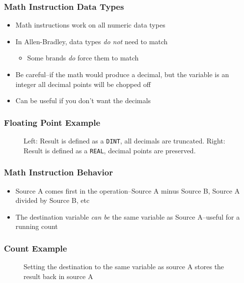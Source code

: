 \begin{frame}
    \frametitle{Math Instruction Data Types}

    \begin{itemize}
        \item Math instructions work on all numeric data types
        \item In Allen-Bradley, data types \emph{do not} need to match
        \begin{itemize}
            \item Some brands \emph{do} force them to match
        \end{itemize}
        \item Be careful--if the math would produce a decimal, but the variable is an integer all decimal points will be chopped off
        \item Can be useful if you don't want the decimals
    \end{itemize}
\end{frame}

\begin{frame}
    \frametitle{Floating Point Example}

    \begin{figure}
        \centering
        

        \vspace{0.5em}
        {\footnotesize Left: Result is defined as a \texttt{DINT}, all decimals are truncated. Right: Result is defined as a \texttt{REAL}, decimal points are preserved.\par}
    \end{figure}
\end{frame}

\begin{frame}
    \frametitle{Math Instruction Behavior}

    \begin{itemize}
        \item Source A comes first in the operation--Source A minus Source B, Source A divided by Source B, etc
        \item The destination variable \emph{can be} the same variable as Source A--useful for a running count
    \end{itemize}
\end{frame}

\begin{frame}
    \frametitle{Count Example}

    \begin{figure}
        \centering
        

        \vspace{0.5em}
        {\footnotesize Setting the destination to the same variable as source A stores the result back in source A\par}
    \end{figure}
\end{frame}

